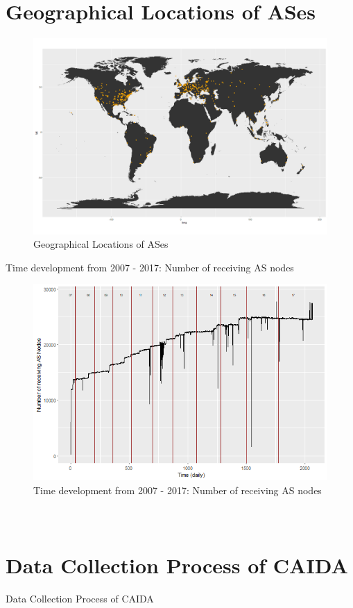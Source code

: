 \documentclass[conference, 11pt]{IEEEtran}
\begin{document}
\section{\\Geographical Locations of ASes}
\begin{figure}[htbp]
\centerline{\includegraphics[scale=0.2]{Graphics/ASesNurPunkte.png}}
\caption{Geographical Locations of ASes}
\label{fig}
\end{figure}


Time development from 2007 - 2017: Number of receiving AS nodes

\begin{figure}[htbp]
\centerline{\includegraphics[scale=0.4]{Graphics/ASToAll.png}}
\caption{Time development from 2007 - 2017: Number of receiving AS nodes}
\label{fig}
\end{figure}




\section{\\Data Collection Process of CAIDA}
Data Collection Process of CAIDA
\end{document}
